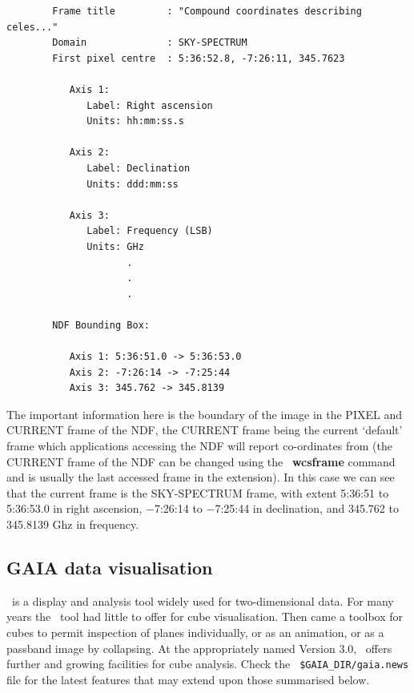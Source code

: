 \documentclass[twoside,11pt]{article}
\newcommand{\xref}[3]{#1}
\newcommand{\xlabel}[1]{}
\begin{document}
{\begin{verbatim}
        Frame title         : "Compound coordinates describing celes..."
        Domain              : SKY-SPECTRUM
        First pixel centre  : 5:36:52.8, -7:26:11, 345.7623

           Axis 1:
              Label: Right ascension
              Units: hh:mm:ss.s

           Axis 2:
              Label: Declination
              Units: ddd:mm:ss

           Axis 3:
              Label: Frequency (LSB)
              Units: GHz
                     .
                     .
                     .

        NDF Bounding Box:

           Axis 1: 5:36:51.0 -> 5:36:53.0
           Axis 2: -7:26:14 -> -7:25:44
           Axis 3: 345.762 -> 345.8139

\end{verbatim}\normalsize

The important information here is the boundary of the image in the
PIXEL and CURRENT frame of the NDF, the CURRENT frame being the
current `default' frame which applications accessing the NDF will
report co-ordinates from (the CURRENT frame of the NDF can be changed
using the \KAPPA\ \xref{{\bf wcsframe}}{sun95}{WCSFRAME} command and is
usually the last accessed frame in the extension).  In this case we can
see that the current frame is the SKY-SPECTRUM frame, with extent
5:36:51 to 5:36:53.0 in right ascension, $-$7:26:14 to $-$7:25:44 in
declination, and 345.762 to 345.8139 Ghz in frequency.


\newpage
\subsection{\xlabel{sc16_gaia}GAIA data visualisation\label{sc16_gaia}}

\GAIAref\ is a display and analysis tool widely used for two-dimensional
data.  For many years the \GAIA\ tool had little to offer for cube
visualisation.  Then came a toolbox for cubes to permit inspection of
planes individually, or as an animation, or as a passband image by
collapsing.  At the appropriately named Version 3.0, \GAIA\ offers
further and growing facilities for cube analysis.  Check the {\tt
\$GAIA\_DIR/gaia.news} file for the latest features that may extend
upon those summarised below.

}
\end{document}
